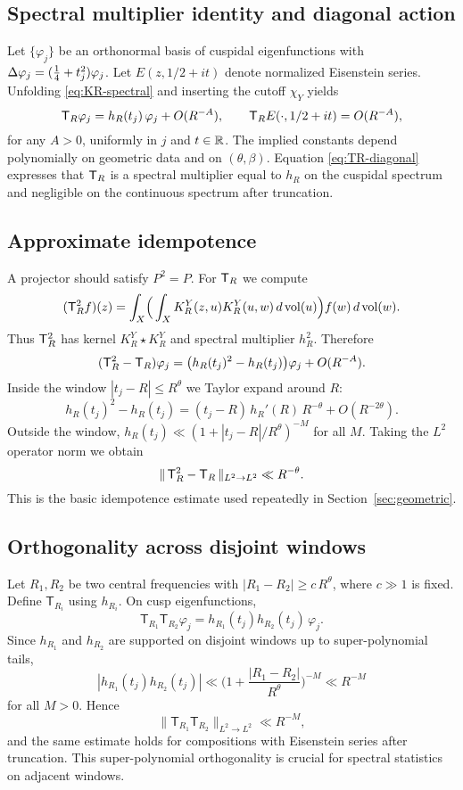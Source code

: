 \subsection{Spectral multiplier identity and diagonal action}\label{subsec:proj-spectrum}
Let $\{\varphi_j\}$ be an orthonormal basis of cuspidal eigenfunctions with $\Delta\varphi_j=(\tfrac14+t_j^2)\varphi_j$.
Let $E(z,1/2+it)$ denote normalized Eisenstein series.
Unfolding \eqref{eq:KR-spectral} and inserting the cutoff $\chi_Y$ yields
\begin{equation}\label{eq:TR-diagonal}
\mathsf{T}_R\varphi_j=h_R(t_j)\,\varphi_j+O(R^{-A}),
\qquad
\mathsf{T}_R E(\cdot,1/2+it)=O(R^{-A}),
\end{equation}
for any $A>0$, uniformly in $j$ and $t\in\mathbb{R}$.
The implied constants depend polynomially on geometric data and on $(\theta,\beta)$.
Equation \eqref{eq:TR-diagonal} expresses that $\mathsf{T}_R$ is a spectral multiplier equal to $h_R$ on the cuspidal spectrum and negligible on the continuous spectrum after truncation.

\subsection{Approximate idempotence}\label{subsec:proj-idempotence}
A projector should satisfy $P^2=P$.
For $\mathsf{T}_R$ we compute
\[
(\mathsf{T}_R^2 f)(z)=\int_X\!\Big(\int_X K_R^Y(z,u)K_R^Y(u,w)\,d\operatorname{vol}(u)\Big)f(w)\,d\operatorname{vol}(w).
\]
Thus $\mathsf{T}_R^2$ has kernel $K_R^Y\star K_R^Y$ and spectral multiplier $h_R^2$.
Therefore
\begin{equation}\label{eq:idemp-eig}
(\mathsf{T}_R^2-\mathsf{T}_R)\varphi_j=\big(h_R(t_j)^2-h_R(t_j)\big)\varphi_j+O(R^{-A}).
\end{equation}
Inside the window $|t_j-R|\le R^\theta$ we Taylor expand around $R$:
\[
h_R(t_j)^2-h_R(t_j)=(t_j-R)\,h_R'(R)\,R^{-\theta}+O(R^{-2\theta}).
\]
Outside the window, $h_R(t_j)\ll (1+|t_j-R|/R^\theta)^{-M}$ for all $M$.
Taking the $L^2$ operator norm we obtain
\begin{equation}\label{eq:TR-idemp-norm}
\|\,\mathsf{T}_R^2-\mathsf{T}_R\,\|_{L^2\to L^2}\ll R^{-\theta}.
\end{equation}
This is the basic idempotence estimate used repeatedly in Section~\ref{sec:geometric}.

\subsection{Orthogonality across disjoint windows}\label{subsec:proj-orth}
Let $R_1,R_2$ be two central frequencies with $|R_1-R_2|\ge c\,R^\theta$, where $c\gg1$ is fixed.
Define $\mathsf{T}_{R_i}$ using $h_{R_i}$.
On cusp eigenfunctions,
\[
\mathsf{T}_{R_1}\mathsf{T}_{R_2}\varphi_j=h_{R_1}(t_j)h_{R_2}(t_j)\,\varphi_j.
\]
Since $h_{R_1}$ and $h_{R_2}$ are supported on disjoint windows up to super-polynomial tails,
\[
|h_{R_1}(t_j)h_{R_2}(t_j)|\ll \Big(1+\frac{|R_1-R_2|}{R^\theta}\Big)^{-M}\ll R^{-M}
\]
for all $M>0$.
Hence
\begin{equation}\label{eq:orth-norm}
\|\mathsf{T}_{R_1}\mathsf{T}_{R_2}\|_{L^2\to L^2}\ll R^{-M},
\end{equation}
and the same estimate holds for compositions with Eisenstein series after truncation.
This super-polynomial orthogonality is crucial for spectral statistics on adjacent windows.


